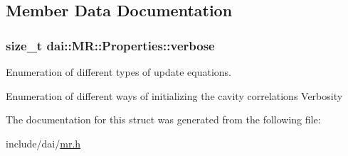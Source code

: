 \subsection{Member Data Documentation}
\hypertarget{structdai_1_1MR_1_1Properties_e0281396e1ee677e1b6ae15f9ae67f99}{
\subsubsection[verbose]{\setlength{\rightskip}{0pt plus 5cm}size\_\-t {\bf dai::MR::Properties::verbose}}}
\label{structdai_1_1MR_1_1Properties_e0281396e1ee677e1b6ae15f9ae67f99}


Enumeration of different types of update equations. 

Enumeration of different ways of initializing the cavity correlations Verbosity 

The documentation for this struct was generated from the following file:\begin{CompactItemize}
\item 
include/dai/\hyperlink{mr_8h}{mr.h}\end{CompactItemize}
